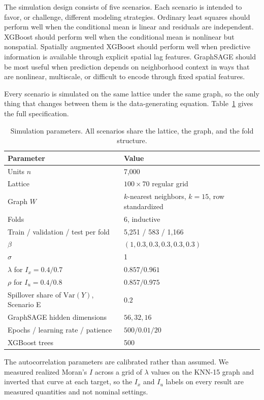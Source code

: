 \documentclass[ASNA, twocolumn]{USG} %
\begin{document}
The simulation design consists of five scenarios. Each scenario is intended to favor, or challenge, different modeling strategies. Ordinary least squares should perform well when the conditional mean is linear and residuals are independent. XGBoost should perform well when the conditional mean is nonlinear but nonspatial. Spatially augmented XGBoost should perform well when predictive information is available through explicit spatial lag features. GraphSAGE should be most useful when prediction depends on neighborhood context in ways that are nonlinear, multiscale, or difficult to encode through fixed spatial features.

Every scenario is simulated on the same lattice under the same graph, so the only thing that changes between them is the data-generating equation. Table~\ref{tab:simulation_parameters} gives the full specification.

\begin{table}[t]
\centering
\caption{Simulation parameters. All scenarios share the lattice, the graph, and the fold structure.}
\label{tab:simulation_parameters}
\begin{tabular}{ll}
\toprule
Parameter & Value \\
\midrule
Units \(n\) & 7{,}000 \\
Lattice & \(100 \times 70\) regular grid \\
Graph \(W\) & \(k\)-nearest neighbors, \(k=15\), row standardized \\
Folds & 6, inductive \\
Train / validation / test per fold & 5{,}251 / 583 / 1{,}166 \\
\(\beta\) & \((1, 0.3, 0.3, 0.3, 0.3, 0.3)\) \\
\(\sigma\) & 1 \\
\(\lambda\) for \(I_x = 0.4 / 0.7\) & \(0.857 / 0.961\) \\
\(\rho\) for \(I_u = 0.4 / 0.8\) & \(0.857 / 0.975\) \\
Spillover share of \(\mathrm{Var}(Y)\), Scenario E & \(0.2\) \\
GraphSAGE hidden dimensions & \(56, 32, 16\) \\
Epochs / learning rate / patience & \(500 / 0.01 / 20\) \\
XGBoost trees & 500 \\
\bottomrule
\end{tabular}
\end{table}

The autocorrelation parameters are calibrated rather than assumed. We measured realized Moran's \(I\) across a grid of \(\lambda\) values on the KNN-15 graph and inverted that curve at each target, so the \(I_x\) and \(I_u\) labels on every result are measured quantities and not nominal settings.
\end{document}
